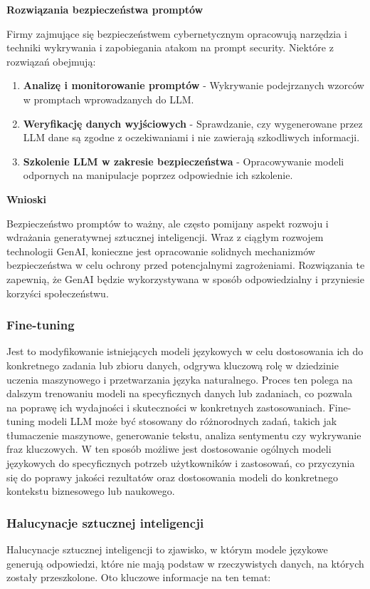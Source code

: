 {\bf Rozwiązania bezpieczeństwa promptów}

\noindent Firmy zajmujące się bezpieczeństwem cybernetycznym opracowują narzędzia i techniki wykrywania i zapobiegania atakom na prompt security. Niektóre z rozwiązań obejmują:

\begin{enumerate}
    \item {\bf Analizę i monitorowanie promptów} - Wykrywanie podejrzanych wzorców w promptach wprowadzanych do LLM.
    \item {\bf Weryfikację danych wyjściowych} - Sprawdzanie, czy wygenerowane przez LLM dane są zgodne z oczekiwaniami i nie zawierają szkodliwych informacji.
    \item {\bf Szkolenie LLM w zakresie bezpieczeństwa} - Opracowywanie modeli odpornych na manipulacje poprzez odpowiednie ich szkolenie.
\end{enumerate}

{\bf Wnioski}

\noindent Bezpieczeństwo promptów to ważny, ale często pomijany aspekt rozwoju i wdrażania generatywnej sztucznej inteligencji. Wraz z ciągłym rozwojem technologii GenAI, konieczne jest opracowanie solidnych mechanizmów bezpieczeństwa w celu ochrony przed potencjalnymi zagrożeniami. Rozwiązania te zapewnią, że GenAI będzie wykorzystywana w sposób odpowiedzialny i przyniesie korzyści społeczeństwu.

\subsubsection{Fine-tuning}
Jest to modyfikowanie istniejących modeli językowych w celu dostosowania ich do konkretnego zadania lub zbioru danych, odgrywa kluczową rolę w dziedzinie uczenia maszynowego i przetwarzania języka naturalnego. Proces ten polega na dalszym trenowaniu modeli na specyficznych danych lub zadaniach, co pozwala na poprawę ich wydajności i skuteczności w konkretnych zastosowaniach. Fine-tuning modeli LLM może być stosowany do różnorodnych zadań, takich jak tłumaczenie maszynowe, generowanie tekstu, analiza sentymentu czy wykrywanie fraz kluczowych. W ten sposób możliwe jest dostosowanie ogólnych modeli językowych do specyficznych potrzeb użytkowników i zastosowań, co przyczynia się do poprawy jakości rezultatów oraz dostosowania modeli do konkretnego kontekstu biznesowego lub naukowego.

\subsubsection{Halucynacje sztucznej inteligencji}
Halucynacje sztucznej inteligencji to zjawisko, w którym modele językowe generują odpowiedzi, które nie mają podstaw w rzeczywistych danych, na których zostały przeszkolone. Oto kluczowe informacje na ten temat:

